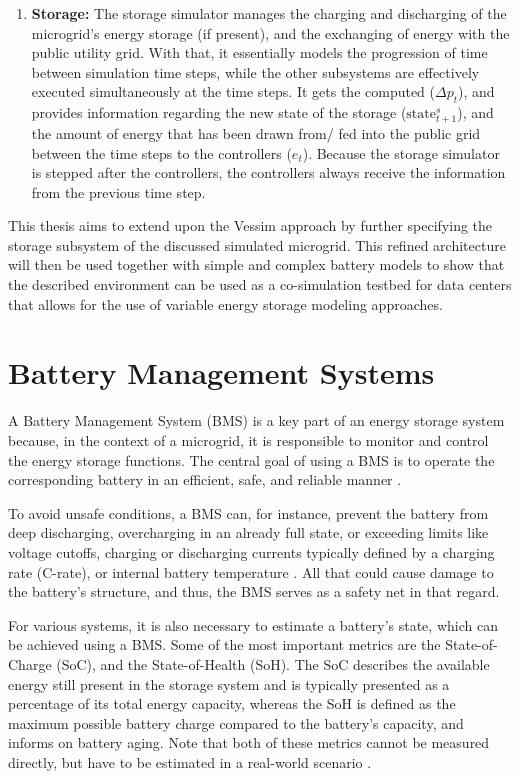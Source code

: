 \begin{enumerate}
    \item \textbf{Storage:} The storage simulator manages the charging and discharging of the microgrid's energy storage (if present), and the exchanging of energy with the public utility grid. With that, it essentially models the progression of time between simulation time steps, while the other subsystems are effectively executed simultaneously at the time steps. It gets the computed ($\Delta p_t$), and provides information regarding the new state of the storage ($\text{state}^s_{t+1}$), and the amount of energy that has been drawn from/ fed into the public grid between the time steps to the controllers ($e_t$). Because the storage simulator is stepped after the controllers, the controllers always receive the information from the previous time step.
\end{enumerate}

This thesis aims to extend upon the Vessim approach by further specifying the storage subsystem of the discussed simulated microgrid. This refined architecture will then be used together with simple and complex battery models to show that the described environment can be used as a co-simulation testbed for data centers that allows for the use of variable energy storage modeling approaches.

\section{Battery Management Systems}
\label{battery_management_systems}
A Battery Management System (BMS) is a key part of an energy storage system because, in the context of a microgrid, it is responsible to monitor and control the energy storage functions. The central goal of using a BMS is to operate the corresponding battery in an efficient, safe, and reliable manner \cite{rahimi2013battery, bergveld2002battery}.

To avoid unsafe conditions, a BMS can, for instance, prevent the battery from deep discharging, overcharging in an already full state, or exceeding limits like voltage cutoffs, charging or discharging currents typically defined by a charging rate (C-rate), or internal battery temperature \cite{rahimi2013battery}. All that could cause damage to the battery's structure, and thus, the BMS serves as a safety net in that regard.

For various systems, it is also necessary to estimate a battery's state, which can be achieved using a BMS. Some of the most important metrics are the State-of-Charge (SoC), and the State-of-Health (SoH). The SoC describes the available energy still present in the storage system and is typically presented as a percentage of its total energy capacity, whereas the SoH is defined as the maximum possible battery charge compared to the battery's capacity, and informs on battery aging. Note that both of these metrics cannot be measured directly, but have to be estimated in a real-world scenario \cite{rahimi2013battery}.

